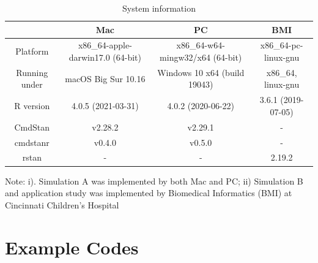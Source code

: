 \begin{table}[H] 
\centering\small
\caption{System information}
 \begin{threeparttable}
\begin{tabular}{c|c|c|c}
\toprule
 & \bf Mac & \bf PC & \bf BMI\\
\hline
Platform & x86\_64-apple-darwin17.0 (64-bit) & x86\_64-w64-mingw32/x64 (64-bit) & x86\_64-pc-linux-gnu\\
\hline
Running under & macOS Big Sur 10.16 & Windows 10 x64 (build 19043) & x86\_64, linux-gnu\\
\hline
R version & 4.0.5 (2021-03-31) & 4.0.2 (2020-06-22) & 3.6.1 (2019-07-05) \\
\hline
CmdStan & v2.28.2 & v2.29.1 & - \\
cmdstanr & v0.4.0 & v0.5.0 & - \\ 
rstan & - & - & 2.19.2 \\
\hline
\bottomrule
\end{tabular}
  \begin{tablenotes}[para]
    \footnotesize
   Note: i). Simulation A was implemented by both Mac and PC; ii) Simulation B and application study was implemented by Biomedical Informatics (BMI) at Cincinnati Children's Hospital
    \end{tablenotes}
 \end{threeparttable}
\label{tab:chp2_system}
\end{table}

\section{Example Codes}

